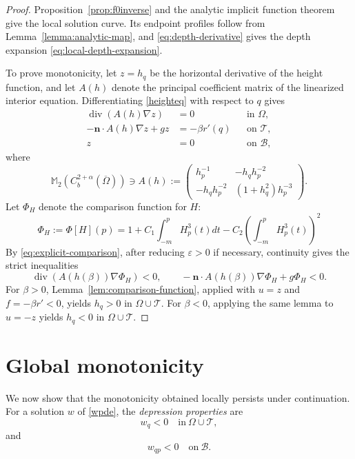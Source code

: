 \documentclass[12pt,letterpaper]{amsart}
\numberwithin{equation}{section}
\begin{document}
	\begin{proof}
		{Proposition~\ref{prop:f0inverse} and the analytic implicit function theorem~\cite[Theorem 4.5.4]{BuffoniToland} give the local solution curve. Its endpoint profiles follow from Lemma~\ref{lemma:analytic-map}, and \eqref{eq:depth-derivative} gives the depth expansion \eqref{eq:local-depth-expansion}.}
		
		{To prove monotonicity, let $z=h_q$ be the horizontal derivative of the height function, and let $A(h)$ denote the principal coefficient matrix of the linearized interior equation. Differentiating \eqref{heighteq} with respect to $q$ gives}
		\begin{align*}
			\operatorname{div}(A(h)\nabla z)&=0&&\text{in }\Omega,\\
			-\mathbf n\cdot A(h)\nabla z+gz&=-\beta r'(q)&&\text{on }\mathcal T,\\
			z&=0&&\text{on }\mathcal B,
		\end{align*}
	where \begin{equation}\label{eq:principal-matrix}
		 \mathbb M_2(C_b^{2+\alpha}(\overline\Omega))\ni A(h):=
		\begin{pmatrix}
			h_p^{-1}&-h_qh_p^{-2}\\
			-h_qh_p^{-2}&(1+h_q^2)h_p^{-3}
		\end{pmatrix}.
	\end{equation}
	{Let $\Phi_H$ denote the comparison function for $H$:}
	\begin{equation*}
	\Phi_H:=\Phi[H](p)=1+C_1\int_{-m}^pH_p^3(t)dt-C_2\left(\int_{-m}^pH_p^3(t)\right)^2
	\end{equation*}
	{By \eqref{eq:explicit-comparison}, after reducing $\varepsilon>0$ if necessary, continuity gives the strict inequalities}
	\[
	\operatorname{div}(A(h(\beta))\nabla\Phi_H)<0,
	\qquad
	-\mathbf n\cdot A(h(\beta))\nabla\Phi_H+g\Phi_H<0.
	\]
{For $\beta>0$, Lemma~\ref{lem:comparison-function}, applied with $u=z$ and $f=-\beta r'<0$, yields $h_q>0$ in $\Omega\cup\mathcal T$. For $\beta<0$, applying the same lemma to $u=-z$ yields $h_q<0$ in $\Omega\cup\mathcal T$.}
	\end{proof}
	
	
	\section{{Global monotonicity}}\label{mono}
		{We now show that the monotonicity obtained locally persists under continuation. For a solution $w$ of \eqref{wpde}, the \emph{depression properties} are}
	\begin{equation}\label{nodaldep}
		w_q<0\quad\mathrm{in~}\Omega\cup \mathcal T,
	\end{equation}
	and \begin{equation*}
		w_{qp}<0\quad\mathrm{on~}\mathcal B.
	\end{equation*}
	
\end{document}
